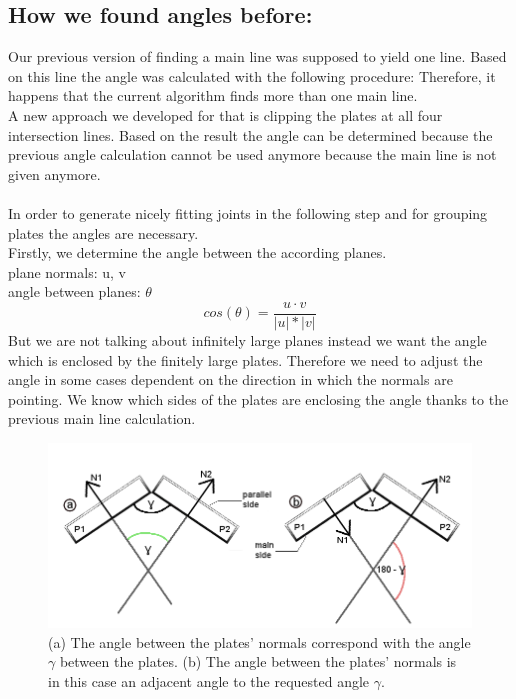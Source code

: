\documentclass[../ClassicThesis.tex]{subfiles}
\begin{document}
\subsection{How we found angles before:}
Our previous version of finding a main line was supposed to yield one line. Based on this line the angle was calculated with the following procedure: 
Therefore, it happens that the current algorithm finds more than one main line. \\
A new approach we developed for that is clipping the plates at all four intersection lines. Based on the result the angle can be determined because the previous angle calculation cannot be used anymore because the main line is not given anymore. \\
\*\\
In order to generate nicely fitting joints in the following step and for grouping plates the angles are necessary.\\
Firstly, we determine the angle between the according planes.\\
plane normals: u, v\\
angle between planes: $\theta$
$$ cos(\theta) = \frac{u \cdot v}{|u| * |v|}$$
But we are not talking about infinitely large planes instead we want the angle which is enclosed by the finitely large plates. Therefore we need to adjust the angle in some cases dependent on the direction in which the normals are pointing. We know which sides of the plates are enclosing the angle thanks to the previous main line calculation.
\begin{figure}[h]

\includegraphics[width= 1\columnwidth]{Images/anglesExamplesSmall.png}
\caption{(a) The angle between the plates' normals correspond with the angle $\gamma$ between the plates. (b) The angle between the plates' normals is in this case an adjacent angle to the requested angle $\gamma$.}
\end{figure}
\end{document}
